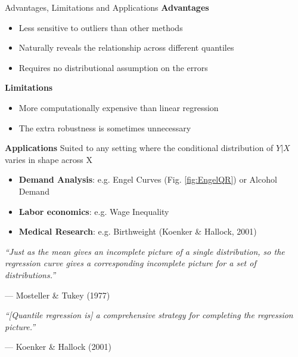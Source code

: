 \documentclass{beamer}
\begin{document}
\begin{frame}{Advantages, Limitations and Applications}
	\textbf{Advantages}
	\begin{itemize}
		\item Less sensitive to outliers than other methods
		\item Naturally reveals the relationship across different quantiles
		\item Requires no distributional assumption on the errors
	\end{itemize}
	\textbf{Limitations}
	\begin{itemize}
		\item More computationally expensive than linear regression
		\item The extra robustness is sometimes unnecessary
	\end{itemize}
	\textbf{Applications}\hfill \break
	Suited to any setting where the conditional distribution of $Y|X$ varies in shape across X
	\begin{itemize}
		\item \textbf{Demand Analysis}: e.g. Engel Curves (Fig. \ref{fig:EngelQR}) or Alcohol Demand
		\item \textbf{Labor economics}: e.g. Wage Inequality
		\item \textbf{Medical Research}: e.g. Birthweight (Koenker \& Hallock, 2001)
	\end{itemize}
\end{frame}

\begin{frame}{}
	\vfill
	\begin{center}
		\Large\textit{``Just as the mean gives an incomplete picture
			of a single distribution, so the regression curve gives a
			corresponding incomplete picture for a set of distributions.''}

		\vspace{0.5em}
		\normalsize --- Mosteller \& Tukey (1977)

		\vspace{1.5em}
		\large\textit{``[Quantile regression is] a comprehensive
			strategy for completing the regression picture.''}

		\vspace{0.5em}
		\normalsize --- Koenker \& Hallock (2001)
	\end{center}
	\vfill
\end{frame}
\end{document}
